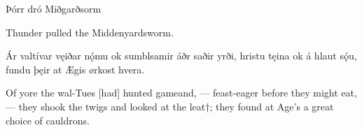 Þórr dró Miðgarðsorm

Thunder pulled the Middenyardsworm.

Ár valtívar \hld vęiðar nǫ́mu
ok sumblsamir \hld áðr saðir yrði,
hristu tęina \hld ok á hlaut sǫ́u,
fundu þęir at Ægis \hld ørkost hvera.

Of yore the wal-Tues [had] hunted game\footnotemark[1] and, — feast-eager before they might eat\footnotemark[1], — they shook the twigs and looked at the leat†; they found at Age’s a great choice of cauldrons.

